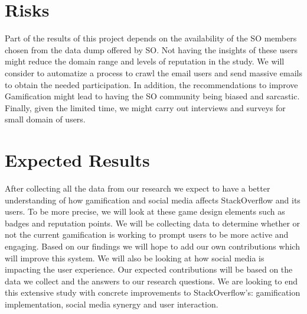 \documentclass{sigchi}
\begin{document}
\section{Risks}

Part of the results of this project depends on the availability of the SO
members chosen from the data dump offered by SO. Not having the insights of
these users might reduce the domain range and levels of reputation in the
study. We will consider to automatize a process to crawl the email users and
send massive emails to obtain the needed participation. In addition, the
recommendations to improve Gamification might lead to having the SO community
being biased and sarcastic. Finally, given the limited time, we might carry out
interviews and surveys for small domain of users.


\section{Expected Results}

After collecting all the data from our research we expect to have a better
understanding of how gamification and social media affects StackOverflow and
its users. To be more precise, we will look at these game design elements
such as badges and reputation points. We will be collecting data to determine whether or not the current gamification is working to prompt users to be more active and
engaging. Based on our findings we will hope to add our own contributions
which will improve this system. We will also be looking at how social media is
impacting the user experience. Our expected contributions will be based on the
data we collect and the answers to our research questions. We are looking to
end this extensive study with concrete improvements to StackOverflow’s:
gamification implementation, social media synergy and user interaction.




% 
% 
\end{document}
